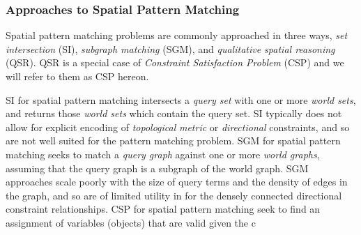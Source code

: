 \subsubsection{Approaches to Spatial Pattern Matching}
\par{
    Spatial pattern matching problems are commonly approached in three ways, \textit{set intersection} (SI), \textit{subgraph matching} (SGM), and \textit{qualitative spatial reasoning} (QSR). 
    QSR is a special case of \textit{Constraint Satisfaction Problem} (CSP) and we will refer to them as CSP hereon. 
    }
\par{
    SI for spatial pattern matching intersects a \textit{query set} with one or more \textit{world sets}, and returns those \textit{world sets} which contain the query set. 
    SI typically does not allow for explicit encoding of \textit{topological} \textit{metric} or \textit{directional} constraints, and so are not well suited for the pattern matching problem.
    SGM for spatial pattern matching seeks to match a \textit{query graph} against one or more \textit{world graphs}, assuming that the query graph is a subgraph of the world graph. 
    SGM approaches scale poorly with the size of query terms and the density of edges in the graph, and so are of limited utility in for the densely connected directional constraint relationships.
    CSP for spatial pattern matching seek to find an assignment of variables (objects) that are valid given the c
    
    

}


